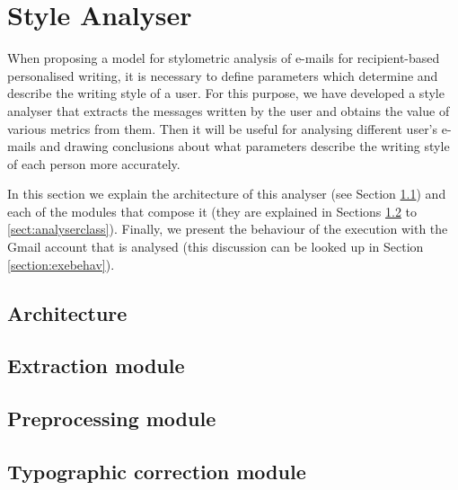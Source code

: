 \chapter{Style Analyser}
\label{cap:analyser}


When proposing a model for stylometric analysis of e-mails for recipient-based personalised writing, it is necessary to define parameters which determine and describe the writing style of a user. For this purpose, we have developed a style analyser that extracts the messages written by the user and obtains the value of various metrics from them. Then it will be useful for analysing different user's e-mails and drawing conclusions about what parameters describe the writing style of each person more accurately.

In this section we explain the architecture of this analyser (see Section \ref{section:stylearch}) and each of the modules that compose it (they are explained in Sections \ref{section:extmod} to \ref{sect:analyserclass}). Finally, we present the behaviour of the execution with the Gmail account that is analysed (this discussion can be looked up in Section \ref{section:exebehav}).

\section{Architecture} \label{section:stylearch}


\section{Extraction module} \label{section:extmod}


\section{Preprocessing module} \label{section:prepmod}


\section{Typographic correction module} \label{section:typomod}


